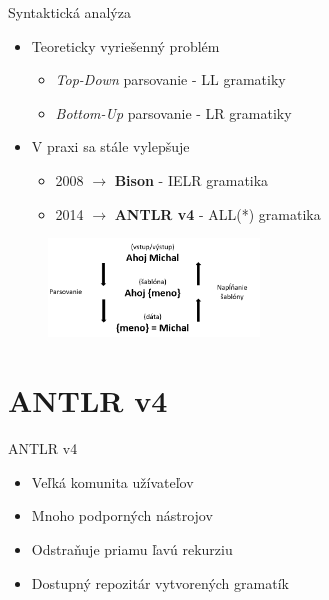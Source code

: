 \documentclass{beamer}
\begin{document}
\begin{frame}{Syntaktická analýza}

\begin{itemize}
  \item Teoreticky vyriešenný problém
  \begin{itemize}
    \item \textit{Top-Down} parsovanie - LL gramatiky
    \item \textit{Bottom-Up} parsovanie - LR gramatiky
  \end{itemize}
  \item V praxi sa stále vylepšuje  
  \begin{itemize}
    \item 2008 $\rightarrow$ \textbf{Bison} - IELR gramatika
    \item 2014 $\rightarrow$ \textbf{ANTLR v4} - ALL(*) gramatika
  \end{itemize}
\end{itemize}

\begin{figure}
\centering
\includegraphics[width=0.5\textwidth]{figures/templatingAndParsing.PNG}
\end{figure}

\end{frame}

\section{ANTLR v4}

\begin{frame}{ANTLR v4}

\begin{itemize}
  \item<1-> Veľká komunita užívateľov
  \item<2-> Mnoho podporných nástrojov
  \item<3-> Odstraňuje priamu ľavú rekurziu
  \item<4-> \alert{Dostupný repozitár vytvorených gramatík}
\end{itemize}

\begin{figure}
\centering
{}
\end{figure}

\end{frame}
\end{document}
